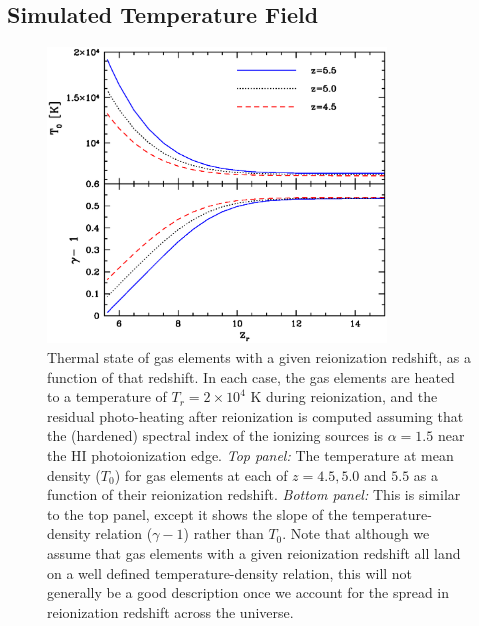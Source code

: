 \subsection{Simulated Temperature Field}
\label{sec:temp_sim}

\begin{figure}
\bc
\includegraphics[width=9cm]{f2.eps}
\caption{Thermal state of gas elements with a given reionization redshift, as a function of that redshift. In each case, the gas elements are heated to
a temperature of $T_r=2 \times 10^4$ K during reionization, and the residual photo-heating after reionization is computed assuming that the
(hardened) spectral index of the ionizing sources is $\alpha=1.5$ near the HI photoionization edge. {\em Top panel:} The temperature
at mean density ($T_0$) for gas elements at each of $z=4.5,5.0$ and $5.5$ as a function of their reionization redshift. {\em Bottom panel:} This is similar to the top panel, except it shows the slope of the temperature-density relation ($\gamma-1$) rather than $T_0$. Note that although we assume that gas
elements with a given reionization redshift all land on a well defined temperature-density relation, this will not generally be
a good description once we account for the spread in reionization redshift across the universe. }
\label{fig:tden_v_zr}
\ec
\end{figure}


